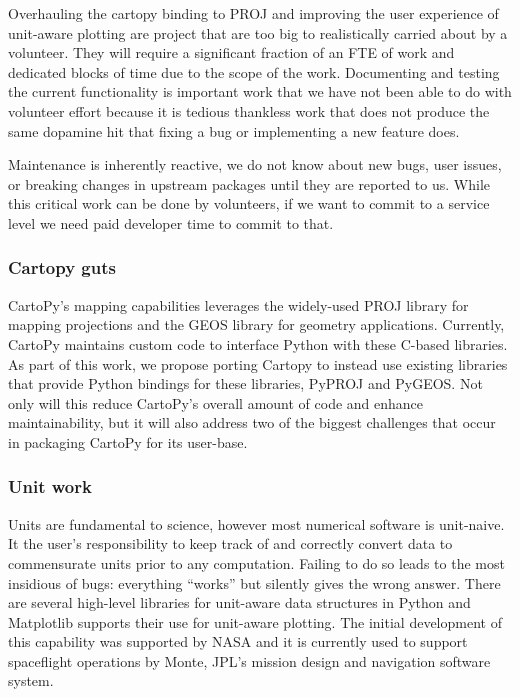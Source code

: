 \documentclass[12pt]{article}
\numberwithin{page}{section}
\begin{document}
Overhauling the cartopy binding to PROJ and improving the user
experience of unit-aware plotting are project that are too big to
realistically carried about by a volunteer.  They will require a
significant fraction of an FTE of work and dedicated blocks of time
due to the scope of the work.  Documenting and testing the current
functionality is important work that we have not been able to do with
volunteer effort because it is tedious thankless work that does not
produce the same dopamine hit that fixing a bug or implementing a new
feature does.

Maintenance is inherently reactive, we do not know about new bugs,
user issues, or breaking changes in upstream packages until they are
reported to us.  While this critical work can be done by volunteers,
if we want to commit to a service level we need paid developer time to
commit to that.


\subsubsection{Cartopy guts}
CartoPy's mapping capabilities leverages the widely-used PROJ library
for mapping projections and the GEOS library for geometry
applications. Currently, CartoPy maintains custom code to interface
Python with these C-based libraries. As part of this work, we propose
porting Cartopy to instead use existing libraries that provide Python
bindings for these libraries, PyPROJ and PyGEOS. Not only will this
reduce CartoPy's overall amount of code and enhance maintainability,
but it will also address two of the biggest challenges that occur in
packaging CartoPy for its user-base.


\subsubsection{Unit work}

Units are fundamental to science, however most numerical software is
unit-naive.  It the user's responsibility to keep track of and
correctly convert data to commensurate units prior to any computation.
Failing to do so leads to the most insidious of bugs: everything
``works'' but silently gives the wrong answer.  There are several
high-level libraries for unit-aware data structures in Python and
Matplotlib supports their use for unit-aware plotting.  The initial
development of this capability was supported by NASA and it is
currently used to support spaceflight operations by Monte, JPL's
mission design and navigation software system.
\end{document}
